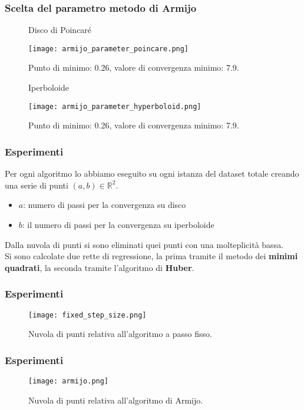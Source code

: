 \documentclass{beamer}
\begin{document}
\begin{frame}
\frametitle{Scelta del parametro metodo di Armijo}
\begin{figure}[ht]
    \begin{minipage}[b]{0.45\linewidth}
        \centering
        Disco di Poincaré\par\medskip
        \texttt{[image: armijo\_parameter\_poincare.png]}
        \caption{Punto di minimo: 0.26, valore di convergenza minimo: 7.9.}
    \end{minipage}
    \hspace{0.5cm}
    \begin{minipage}[b]{0.45\linewidth}
        \centering
        Iperboloide\par\medskip
        \texttt{[image: armijo\_parameter\_hyperboloid.png]}
        \caption{Punto di minimo: 0.26, valore di convergenza minimo: 7.9.}
    \end{minipage}
\end{figure}
\end{frame}

\begin{frame}
\frametitle{Esperimenti}
Per ogni algoritmo lo abbiamo eseguito su ogni istanza del dataset totale creando una serie di punti $(a, b) \in \mathbb{R}^2$.\\
\begin{itemize}
    \item $a$: numero di passi per la convergenza su disco
    \item $b$: il numero di passi per la convergenza su iperboloide
\end{itemize}
Dalla nuvola di punti si sono eliminati quei punti con una molteplicità bassa.\\
Si sono calcolate due rette di regressione, la prima tramite il metodo dei \textbf{minimi quadrati}, la seconda tramite l’algoritmo di \textbf{Huber}.
\end{frame}

\begin{frame}
\frametitle{Esperimenti}
\begin{figure}[H]
    \texttt{[image: fixed\_step\_size.png]}
    \caption{Nuvola di punti relativa all’algoritmo a passo fisso.}
\end{figure}
\end{frame}

\begin{frame}
\frametitle{Esperimenti}
\begin{figure}[H]
    \texttt{[image: armijo.png]}
    \caption{Nuvola di punti relativa all’algoritmo di Armijo.}
\end{figure}
\end{frame}
\end{document}

